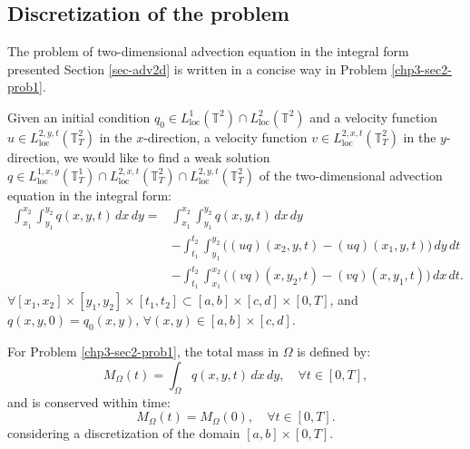 \subsection{Discretization of the problem}
The problem of two-dimensional advection equation in the integral form 
presented Section \ref{sec-adv2d} is written in a concise way in Problem \ref{chp3-sec2-prob1}.
\begin{prob}
	\label{chp3-sec2-prob1}
	Given an initial condition ${q}_0\in {L}^{1}_{\text{loc}}(\mathbb{T}^2) \cap {L}^{2}_{\text{loc}}(\mathbb{T}^2)$ and
	a velocity function $u \in {L}^{2,y,t}_{\text{loc}}(\mathbb{T}^2_{T})$ in the $x$-direction, 
	a velocity function $v \in {L}^{2,x,t}_{\text{loc}}(\mathbb{T}^2_{T})$ in the $y$-direction, 
 	we would like to find a weak solution 
 	${q} \in {L}^{1,x,y}_{\text{loc}}(\mathbb{T}^1_{T}) \cap {L}^{2,x,t}_{\text{loc}}(\mathbb{T}^2_{T}) \cap {L}^{2,y,t}_{\text{loc}}(\mathbb{T}^2_{T})$
	of the two-dimensional advection equation in the integral form:
	\begin{align*}
		\int_{x_1}^{x_2} \int_{y_1}^{y_2}
		{q}(x, y, t) \,dx \,dy = &\int_{x_1}^{x_2} \int_{y_1}^{y_2}
		{q}(x, y, t) \,dx \,dy \\ \nonumber
		&-\int_{t_1}^{t_2} \int_{y_1}^{y_2} \bigg({(uq)}(x_2, y, t)
		-{(uq)}(x_1, y, t) \bigg) \,dy \,dt\\ \nonumber
		&-\int_{t_1}^{t_2} \int_{x_1}^{x_2} \bigg({(vq)}(x, y_2, t)
		-{(vq)}(x, y_1, t) \bigg) \,dx \,dt.
	\end{align*}
	$\forall [x_1, x_2]\times [y_1, y_2] \times[t_1, t_2] \subset [a,b] \times [c,d] \times[0,T]$, 
	and ${q}(x, y, 0) = {q}_0(x, y)$, $\forall (x, y) \in [a,b] \times [c,d]$.
\end{prob}
For Problem \ref{chp3-sec2-prob1}, the total mass in $\Omega$ is defined by: 
\begin{equation}
	{M}_{\Omega}(t) = \int_{\Omega} {q}(x,y,t) \,dx \,dy , \quad \forall t \in [0,T],
\end{equation}
and is conserved within time: 
\begin{equation}
	{M}_{\Omega}(t) = {M}_{\Omega}(0), \quad \forall t \in [0,T].
\end{equation}
considering a discretization of the domain $[a,b] \times [0,T]$. 

